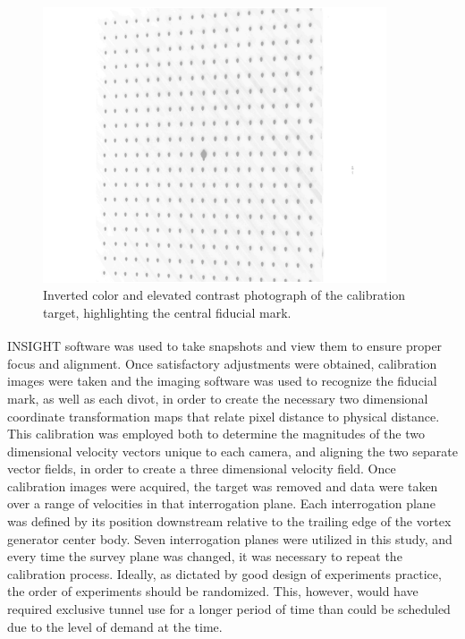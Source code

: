 \vspace{32pt}
\begin{figure}[H]
	\centering
	\includegraphics[width=4in]{figs/piv_method/calibration_target}
	\caption{Inverted color and elevated contrast photograph of the calibration 
		target, highlighting the central fiducial mark.}
	\label{fig:calibration_target}
\end{figure}


INSIGHT\textsuperscript{\textcopyright} software was used to take snapshots and 
view them to ensure proper focus 
and alignment. Once satisfactory adjustments were obtained, calibration images 
were taken and the imaging software was used to recognize the fiducial mark, as 
well as each divot, in order to create the necessary two dimensional coordinate 
transformation maps that relate
pixel distance to physical distance. This calibration was employed both to 
determine the magnitudes of the two dimensional velocity vectors unique to each 
camera, and aligning the two separate vector fields, in order to create a three 
dimensional velocity field. Once calibration images were acquired, the 
target was removed and data were taken over a range of velocities in 
that interrogation plane. Each interrogation plane was defined by its position 
downstream relative to the trailing edge of the vortex generator center body. 
Seven interrogation planes were utilized in this study, and every time the 
survey plane was changed, it was necessary to repeat the calibration process. 
Ideally, as dictated by good design of experiments 
practice, the order of experiments should be randomized. This, however, would 
have required exclusive tunnel use for a longer period of time than could be 
scheduled due to the level of demand at the time.

